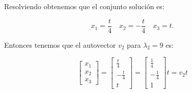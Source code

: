 \begin{frame}
\begin{itemize}
		      Resolviendo obtenemos que el conjunto solución es:

		      \begin{equation*}
			      x_{1}=\frac{t}{4}\quad
			      x_{2}=-\frac{t}{4}\quad
			      x_{3}=t.
		      \end{equation*}

		      Entonces tenemos que el autovector $v_{2}$ para $\lambda_{2}=9$ es:

		      \begin{equation*}
			      \begin{bmatrix}
				      x_{1} \\
				      x_{2} \\
				      x_{3}
			      \end{bmatrix}=
			      \begin{bmatrix}
				      \frac{t}{4}  \\
				      -\frac{t}{4} \\
				      t
			      \end{bmatrix} =
			      \begin{bmatrix}
				      \frac{1}{4}  \\
				      -\frac{1}{4} \\
				      1
			      \end{bmatrix}t=
			      v_{2}t
		      \end{equation*}
	\end{itemize}
\end{frame}

